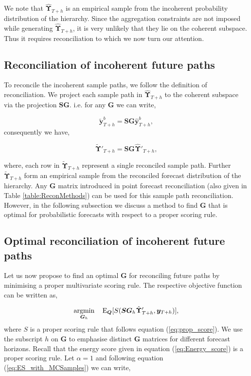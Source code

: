 \documentclass[12pt]{article}
\def\E{\text{E}}
\theoremstyle{definition}
\begin{document}
We note that $\hat{\bm{\Upsilon}}_{T+h}$ is an empirical sample from the incoherent probability distribution of the hierarchy. Since the aggregation constraints are not imposed while generating $\hat{\bm{\Upsilon}}_{T+h}$, it is very unlikely that they lie on the coherent subspace. Thus it requires reconciliation to which we now turn our attention.

\subsection{Reconciliation of incoherent future paths}

To reconcile the incoherent sample paths, we follow the definition of reconciliation. We project each sample path in $\hat{\bm{\Upsilon}}_{T+h}$ to the coherent subspace via the projection $\bm{SG}$. i.e. for any $\bm{G}$ we can write,

\begin{equation} \label{eq:sampleRecon_1}
\tilde{\bm{y}}_{T+h}^b = \bm{SG}\hat{\bm{y}}_{T+h}^b,
\end{equation}
consequently we have,

\begin{equation} \label{eq:sampleRecon_2}
\tilde{\bm{\Upsilon}}'_{T+h} = \bm{SG}\hat{\bm{\Upsilon}}'_{T+h},
\end{equation}

where, each row in $\tilde{\bm{\Upsilon}}_{T+h}$ represent a single reconciled sample path. Further $\tilde{\bm{\Upsilon}}_{T+h}$ form an empirical sample from the reconciled forecast distribution of the hierarchy. Any $\bm{G}$ matrix introduced in point forecast reconciliation (also given in Table \ref{table:ReconMethods}) can be used for this sample path reconciliation. However, in the following subsection we discuss a method to find $\bm{G}$ that is optimal for probabilistic forecasts with respect to a proper scoring rule.

\subsection{Optimal reconciliation of incoherent future paths}\label{subsec:Optimal_recon}

Let us now propose to find an optimal $\bm{G}$ for reconciling future paths by minimising a proper multivariate scoring rule. The respective objective function can be written as,

\begin{equation} \label{eq:Obj_func_1}
\operatornamewithlimits{argmin}_{\bm{G}_h} \quad \E_{\bm{Q}}[S(\bm{SG}_h\hat{\bm{\Upsilon}}'_{T+h}, \bm{y}_{T+h})],
\end{equation}
where $S$ is a proper scoring rule that follows equation (\ref{eq:prop_score}). We use the subscript $h$ on $\bm{G}$ to emphasise distinct $\bm{G}$ matrices for different forecast horizons. Recall that the energy score given in equation (\ref{eq:Energy_score}) is a proper scoring rule. Let $\alpha = 1$ and following equation (\ref{eq:ES_with_MCSamples}) we can write,
\end{document}
